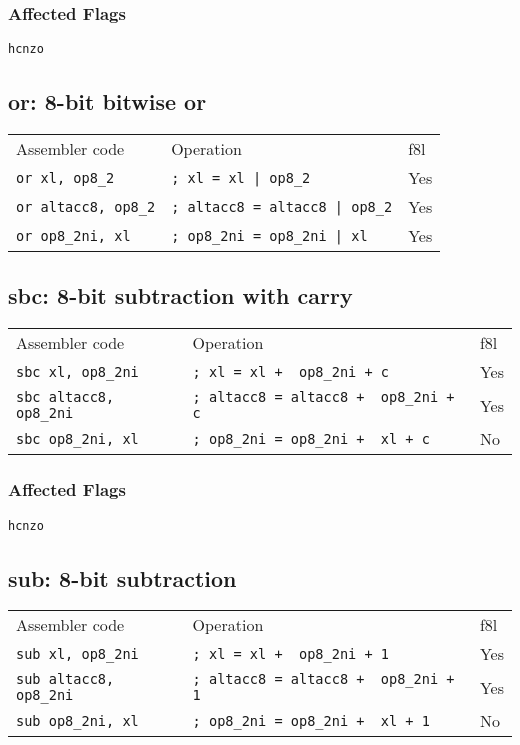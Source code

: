 \documentclass{book}
\begin{document}
\subsubsection*{Affected Flags}

\texttt{hcnzo}


\subsection{or: 8-bit bitwise or}

\begin{tabular}{l l l}
Assembler code              & Operation                             & f8l \\
\texttt{or xl, op8\_2}      & \texttt{; xl = xl | op8\_2}           & Yes \\
\texttt{or altacc8, op8\_2} & \texttt{; altacc8 = altacc8 | op8\_2} & Yes \\
\texttt{or op8\_2ni, xl}    & \texttt{; op8\_2ni = op8\_2ni | xl}   & Yes
\end{tabular}


\subsection{sbc: 8-bit subtraction with carry}

\begin{tabular}{l l l}
Assembler code                 & Operation                                    & f8l \\
\texttt{sbc xl, op8\_2ni}      & \texttt{; xl = xl + ~op8\_2ni + c}           & Yes \\
\texttt{sbc altacc8, op8\_2ni} & \texttt{; altacc8 = altacc8 + ~op8\_2ni + c} & Yes \\
\texttt{sbc op8\_2ni, xl}      & \texttt{; op8\_2ni = op8\_2ni + ~xl + c}     & No
\end{tabular}

\subsubsection*{Affected Flags}

\texttt{hcnzo}


\subsection{sub: 8-bit subtraction}

\begin{tabular}{l l l}
Assembler code                 & Operation                                    & f8l \\
\texttt{sub xl, op8\_2ni}      & \texttt{; xl = xl + ~op8\_2ni + 1}           & Yes \\
\texttt{sub altacc8, op8\_2ni} & \texttt{; altacc8 = altacc8 + ~op8\_2ni + 1} & Yes \\
\texttt{sub op8\_2ni, xl}      & \texttt{; op8\_2ni = op8\_2ni + ~xl + 1}     & No
\end{tabular}
\end{document}
